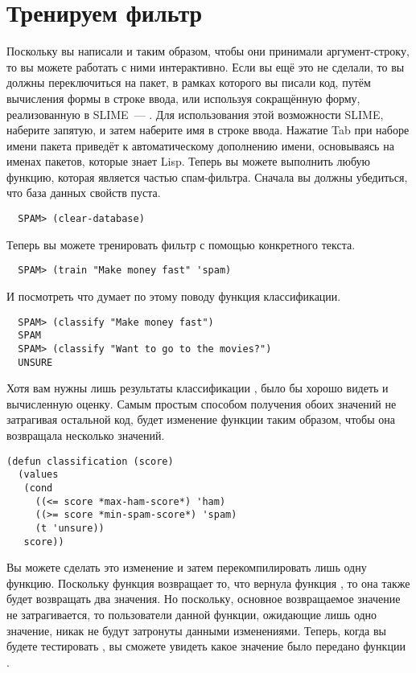 \section{Тренируем фильтр}

Поскольку вы написали  и  таким образом, чтобы они принимали
аргумент-строку, то вы можете работать с ними интерактивно.  Если вы ещё это не сделали,
то вы должны переключиться на пакет, в рамках которого вы писали код, путём вычисления
формы  в строке ввода, или используя сокращённую форму, реализованную в
SLIME~--- .  Для использования этой возможности SLIME, наберите
запятую, и затем наберите имя в строке ввода.  Нажатие Tab при наборе имени пакета
приведёт к автоматическому дополнению имени, основываясь на именах пакетов, которые знает
Lisp.  Теперь вы можете выполнить любую функцию, которая является частью спам-фильтра.
Сначала вы должны убедиться, что база данных свойств пуста.

\begin{verbatim}
  SPAM> (clear-database)
\end{verbatim}

Теперь вы можете тренировать фильтр с помощью конкретного текста.

\begin{verbatim}
  SPAM> (train "Make money fast" 'spam)
\end{verbatim}

И посмотреть что думает по этому поводу функция классификации.

\begin{verbatim}
  SPAM> (classify "Make money fast")
  SPAM
  SPAM> (classify "Want to go to the movies?")
  UNSURE
\end{verbatim}

Хотя вам нужны лишь результаты классификации , было бы хорошо видеть и вычисленную оценку.
Самым простым способом получения обоих значений не затрагивая остальной код, будет
изменение функции  таким образом, чтобы она возвращала несколько
значений.

\begin{lstlisting}
(defun classification (score)
  (values
   (cond
     ((<= score *max-ham-score*) 'ham)
     ((>= score *min-spam-score*) 'spam)
     (t 'unsure))
   score))
\end{lstlisting}

Вы можете сделать это изменение и затем перекомпилировать лишь одну функцию.  Поскольку
функция  возвращает то, что вернула функция , то она
также будет возвращать два значения.  Но поскольку, основное возвращаемое значение не
затрагивается, то пользователи данной функции, ожидающие лишь одно значение, никак не
будут затронуты данными изменениями.  Теперь, когда вы будете тестировать ,
вы сможете увидеть какое значение было передано функции .

